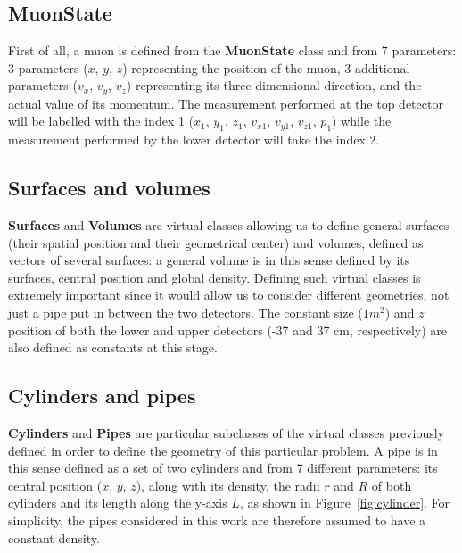 \documentclass[a4paper, 11pt, twoside, openright]{report}
\begin{document}
\subsection{MuonState}

First of all, a muon is defined from the \textbf{MuonState} class and from 7 parameters: 3 parameters ($x$, $y$, $z$) representing the position of the muon, 3 additional parameters ($v_x$, $v_y$, $v_z$) representing its three-dimensional direction, and the actual value of its momentum. The measurement performed at the top detector will be labelled with the index 1 ($x_1$, $y_1$, $z_1$, $v_{x1}$, $v_{y1}$, $v_{z1}$, $p_1$) while the measurement performed by the lower detector will take the index 2.

\subsection{Surfaces and volumes}

\textbf{Surfaces} and \textbf{Volumes} are virtual classes allowing us to define general surfaces (their spatial position and their geometrical center) and volumes, defined as vectors of several surfaces: a general volume is in this sense defined by its surfaces, central position and global density. Defining such virtual classes is extremely important since it would allow us to consider different geometries, not just a pipe put in between the two detectors. The constant size ($1 m^2$) and $z$ position of both the lower and upper detectors (-37 and 37 cm, respectively) are also defined as constants at this stage.

\subsection{Cylinders and pipes}

\textbf{Cylinders} and \textbf{Pipes} are particular subclasses of the virtual classes previously defined in order to define the geometry of this particular problem. A pipe is in this sense defined as a set of two cylinders and from 7 different parameters: its central position ($x$, $y$, $z$), along with its density, the radii $r$ and $R$ of both cylinders and its length along the y-axis $L$, as shown in Figure~\ref{fig:cylinder}. For simplicity, the pipes considered in this work are therefore assumed to have a constant density.
\end{document}
